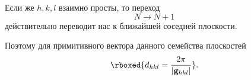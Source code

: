 \documentclass[../final.tex]{subfiles}
\begin{document}
Если же $h,k,l$ взаимно просты, то переход
%
\begin{equation*}
    N\longrightarrow N+1
\end{equation*}
%
действительно переводит нас к ближайшей соседней плоскости.

Поэтому для примитивного вектора данного семейства плоскостей
%
\begin{equation*}
    \rboxed{
        d_{hkl}
        =
        \frac{2\pi}{
            |\mathbf g_{hkl}|
        }
    }.
\end{equation*}
\end{document}
